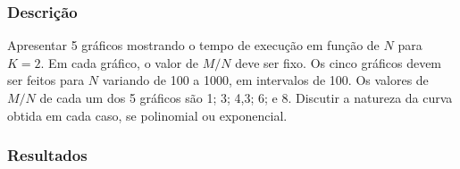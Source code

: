 	\subsubsection{Descrição}
		Apresentar 5 gráficos mostrando o tempo de execução em função de $N$ para $K = 2$. Em cada gráfico, o valor de $M / N$ deve ser fixo. Os cinco gráficos devem ser feitos para $N$ variando de 100 a 1000, em intervalos de 100. Os valores de $M / N$ de cada um dos 5 gráficos são 1; 3; 4,3; 6; e 8. Discutir a natureza da curva obtida em cada caso, se polinomial ou exponencial.
	
	\subsubsection{Resultados}
		\begin{table}[!htb]
			\label{tab:2satTempos}
			\caption{Comparação de tempos (segundos) de Max 2-SAT}
		\end{table}
		
